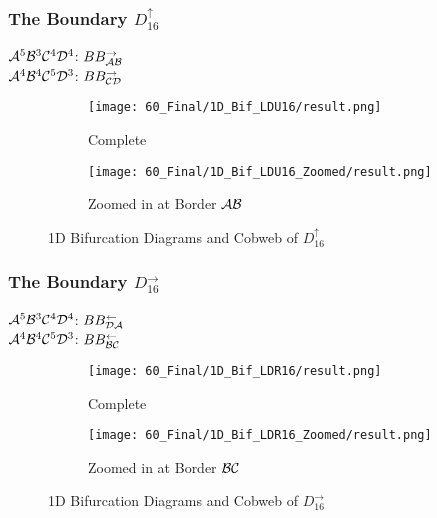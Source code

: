 \subsubsection{The Boundary $D_{16}^\uparrow$}

$\mathcal{A}^5\mathcal{B}^3\mathcal{C}^4\mathcal{D}^4$: $BB_{\mathcal{A}\mathcal{B}}^\rightarrow$ \\
$\mathcal{A}^4\mathcal{B}^4\mathcal{C}^5\mathcal{D}^3$: $BB_{\mathcal{C}\mathcal{D}}^\rightarrow$

\begin{figure}
    \centering
    \begin{subfigure}{0.4\textwidth}
        \centering
        \texttt{[image: 60\_Final/1D\_Bif\_LDU16/result.png]}
        \caption{Complete}
        \label{fig:final.bifurcation.D.up}
    \end{subfigure}
    \begin{subfigure}{0.4\textwidth}
        \centering
        \texttt{[image: 60\_Final/1D\_Bif\_LDU16\_Zoomed/result.png]}
        \caption{Zoomed in at Border $\mathcal{A}\mathcal{B}$}
        \label{fig:final.bifurcation.D.up.zoomed}
    \end{subfigure}
    \caption{1D Bifurcation Diagrams and Cobweb of $D_{16}^\uparrow$}
\end{figure}

\subsubsection{The Boundary $D_{16}^\rightarrow$}

$\mathcal{A}^5\mathcal{B}^3\mathcal{C}^4\mathcal{D}^4$: $BB_{\mathcal{D}\mathcal{A}}^\leftarrow$ \\
$\mathcal{A}^4\mathcal{B}^4\mathcal{C}^5\mathcal{D}^3$: $BB_{\mathcal{B}\mathcal{C}}^\leftarrow$

\begin{figure}
    \centering
    \begin{subfigure}{0.4\textwidth}
        \centering
        \texttt{[image: 60\_Final/1D\_Bif\_LDR16/result.png]}
        \caption{Complete}
        \label{fig:final.bifurcation.D.right}
    \end{subfigure}
    \begin{subfigure}{0.4\textwidth}
        \centering
        \texttt{[image: 60\_Final/1D\_Bif\_LDR16\_Zoomed/result.png]}
        \caption{Zoomed in at Border $\mathcal{B}\mathcal{C}$}
        \label{fig:final.bifurcation.D.right.zoomed}
    \end{subfigure}
    \caption{1D Bifurcation Diagrams and Cobweb of $D_{16}^\rightarrow$}
\end{figure}

